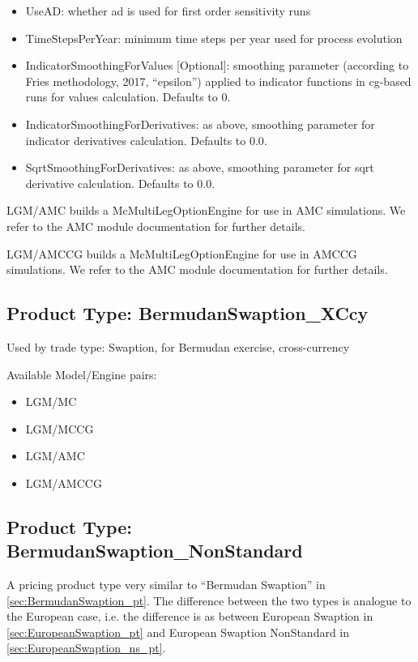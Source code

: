 \begin{itemize}
\item UseAD: whether ad is used for first order sensitivity runs
\item TimeStepsPerYear: minimum time steps per year used for process evolution
\item IndicatorSmoothingForValues [Optional]: smoothing parameter (according to Fries methodology, 2017, ``epsilon'')
  applied to indicator functions in cg-based runs for values calculation. Defaults to $0$.
\item IndicatorSmoothingForDerivatives: as above, smoothing parameter for indicator derivatives calculation. Defaults to $0.0$.
\item SqrtSmoothingForDerivatives: as above, smoothing parameter for sqrt derivative calculation. Defaults to $0.0$.
\end{itemize}

LGM/AMC builds a McMultiLegOptionEngine for use in AMC simulations. We refer to the AMC module documentation for further
details.

LGM/AMCCG builds a McMultiLegOptionEngine for use in AMCCG simulations. We refer to the AMC module documentation for
further details.

\subsection{Product Type: BermudanSwaption\_XCcy}
\label{sec:BermudanSwaption_XCcy_pt}
Used by trade type: Swaption, for Bermudan exercise, cross-currency

Available Model/Engine pairs:

\begin{itemize}
\item LGM/MC
\item LGM/MCCG
\item LGM/AMC
\item LGM/AMCCG
\end{itemize}

\subsection{Product Type: BermudanSwaption\_NonStandard}

A pricing product type very similar to ``Bermudan Swaption'' in \ref{sec:BermudanSwaption_pt}.
The difference between the two types is analogue to the European case, i.e. the difference is
as between European Swaption in \ref{sec:EuropeanSwaption_pt} and European Swaption NonStandard in \ref{sec:EuropeanSwaption_ns_pt}.

